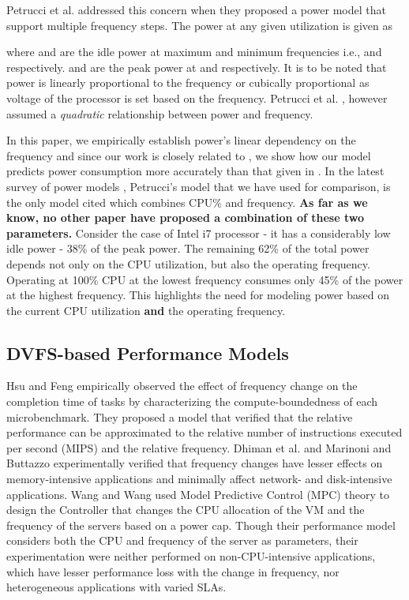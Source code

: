 \documentclass{sig-alternate}
\begin{document}
Petrucci et al. \cite{Petrucci2011} addressed this concern when they proposed a power model that support multiple frequency steps. The power  at any given utilization  is given as 

 


where  and  are the idle power at maximum and minimum frequencies i.e.,  and  respectively.  and  are the peak power at  and  respectively. It is to be noted that power is linearly proportional to the frequency or cubically proportional as voltage of the processor is set based on the frequency. Petrucci et al. \cite{Petrucci2011}, however assumed a \emph{quadratic} relationship between power and frequency. 

In this paper, we empirically establish power's linear dependency on the frequency and since our work is closely related to \cite{Petrucci2011}, we show how our model predicts power consumption more accurately than that given in \cite{Petrucci2011}. In the latest survey of power models \cite{Mobius}, Petrucci's model that we have used for comparison, is the only model cited which combines CPU\% and frequency. \textbf{As far as we know, no other paper have 
proposed a combination of these two parameters.} Consider the case of Intel i7 processor - it has a considerably low idle power - 38\% of the peak power. The remaining 62\% of the total power depends not only on the CPU utilization, but also the operating frequency. Operating at 100\% CPU at the lowest frequency consumes only 45\% of the power at the highest frequency. This highlights the need for modeling power based on the current CPU utilization \textbf{and} the operating frequency.
\subsection{DVFS-based Performance Models}
\label{perf} Hsu and Feng \cite{Hsu2005} empirically observed the effect of frequency change on the completion time of tasks by characterizing the compute-boundedness of each microbenchmark. They proposed a model that verified that the relative performance can be approximated to the relative number of instructions executed per second (MIPS) and the relative frequency. Dhiman et al. \cite{Dhiman2008} and Marinoni and Buttazzo \cite{Marinoni2007} experimentally verified that frequency changes have lesser effects on memory-intensive applications and minimally affect network- and disk-intensive applications. Wang and Wang \cite{Wang2011} used Model Predictive Control (MPC) theory to design the Controller that changes the CPU allocation of the VM and the frequency of the servers based on a power cap. Though their performance model considers both the CPU and frequency of the server as parameters, their experimentation were neither performed on non-CPU-intensive applications, which have lesser performance loss with the change in frequency, nor heterogeneous applications with varied SLAs. 
\end{document}
